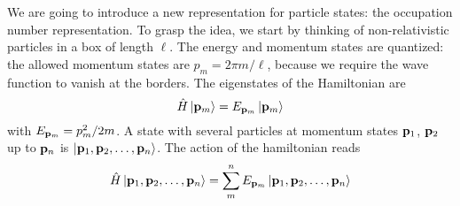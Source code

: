 We are going to introduce a new representation for particle states: the occupation number representation. To grasp the idea, we start by thinking of non-relativistic particles in a box of length $\ell$. The energy and momentum states are quantized: the allowed momentum states are $p_m=2\pi m/\ell$, because we require the wave function to vanish at the borders. The eigenstates of the Hamiltonian are
\begin{equation}
    \hat{H}\ket{\vb{p}_m}=E_{\vb{p}_m}\ket{\vb{p}_m}
\end{equation}
with $E_{\vb{p}_m}=p_m^2/2m$. 
A state with several particles at momentum states $\vb{p}_1$, $\vb{p}_2$ up to $\vb{p}_n$ is $\ket{\vb{p}_1,\vb{p}_2,\dots, \vb{p}_n}$. The action of the hamiltonian reads
\begin{equation}
    \hat{H}\ket{\vb{p}_1,\vb{p}_2,\dots, \vb{p}_n}=\sum_m^n E_{\vb{p}_m}\ket{\vb{p}_1,\vb{p}_2,\dots, \vb{p}_n}
\end{equation}

